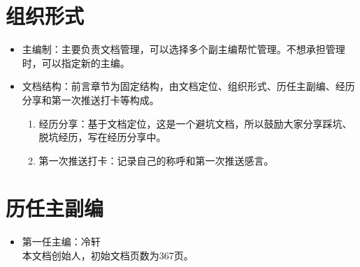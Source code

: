 \documentclass[cn,11pt,chinese,twoside]{elegantbook}
\begin{document}
\section*{组织形式}
\begin{itemize}
\item 主编制：主要负责文档管理，可以选择多个副主编帮忙管理。不想承担管理时，可以指定新的主编。
\item 文档结构：前言章节为固定结构，由文档定位、组织形式、历任主副编、经历分享和第一次推送打卡等构成。
\begin{enumerate}
\item 经历分享：基于文档定位，这是一个避坑文档，所以鼓励大家分享踩坑、脱坑经历，写在经历分享中。
\item 第一次推送打卡：记录自己的称呼和第一次推送感言。
\end{enumerate}
\end{itemize}



\section*{历任主副编}
\begin{itemize}
\item 第一任主编：冷轩\\
本文档创始人，初始文档页数为367页。
\end{itemize}
\end{document}
